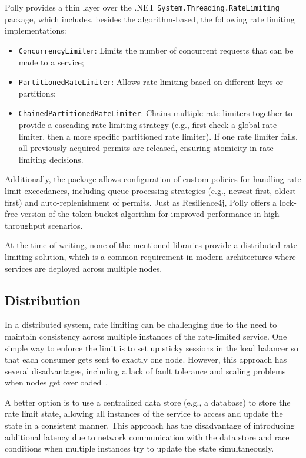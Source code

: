 Polly provides a thin layer over the .NET \texttt{System.Threading.RateLimiting}~\cite{microsoft-rate-limiting-dotnet} package, which includes, besides the algorithm-based, the following rate limiting implementations:
\begin{itemize}
    \item \texttt{ConcurrencyLimiter}: Limits the number of concurrent requests that can be made to a service;
    \item \texttt{PartitionedRateLimiter}: Allows rate limiting based on different keys or partitions;
    \item \texttt{ChainedPartitionedRateLimiter}:
    Chains multiple rate limiters together to provide a cascading rate limiting strategy (e.g., first check a global rate limiter, then a more specific partitioned rate limiter).
    If one rate limiter fails, all previously acquired permits are released, ensuring atomicity in rate limiting decisions.
\end{itemize}

Additionally, the package allows configuration of custom policies for handling rate limit exceedances, including queue processing strategies (e.g., newest first, oldest first) and auto-replenishment of permits.
Just as Resilience4j, Polly offers a lock-free version of the token bucket algorithm for improved performance in high-throughput scenarios.

At the time of writing, none of the mentioned libraries provide a distributed rate limiting solution,
which is a common requirement in modern architectures where services are deployed across multiple nodes.

\subsection{Distribution}\label{subsec:rate-limiter-distribution}

In a distributed system,
rate limiting can be challenging due to the need
to maintain consistency across multiple instances of the rate-limited service.
One simple way to enforce the limit is
to set up sticky sessions in the load balancer so that each consumer gets sent to exactly one node.
However, this approach has several disadvantages,
including a lack of fault tolerance and scaling problems when nodes get overloaded~\cite{kong-rate-limiting}.

A better option is to use a centralized data store (e.g., a database) to store the rate limit state,
allowing all instances of the service to access and update the state in a consistent manner.
This approach has the disadvantage
of introducing additional latency due to network communication with the data store and race conditions when
multiple instances try to update the state simultaneously.

